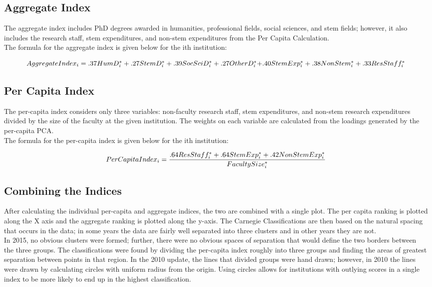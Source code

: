 \documentclass{article}
\begin{document}
\subsection{Aggregate Index}
 The aggregate index includes PhD degrees awarded in humanities, professional fields, social sciences, and stem fields; however, it also includes the research staff, stem expenditures, and non-stem expenditures from the Per Capita Calculation.\\
 The formula for the aggregate index is given below for the ith institution:
 \begin{center}
	\begin{equation}
	\centering
	$$AggregateIndex_{i} =  .37HumD^{*}_{i} + .27StemD^{*}_{i} + .39SocSciD^{*}_{i} + .27OtherD^{*}_{i} $$
	$$ + .40StemExp^{*}_{i} + .38NonStem^{*}_{i} + .33ResStaff^{*}_{i} $$
	\label{eqn:agindex}

	\end{equation}
\end{center}

  \subsection{Per Capita Index}
 The per-capita index considers only three variables: non-faculty research staff, stem expenditures, and non-stem research expenditures divided by the size of the faculty at the given institution. The weights on each variable are calculated from the loadings generated by the per-capita PCA. \\
     The formula for the per-capita index is given below for the ith institution:
     
     \begin{equation}
     \centering
     PerCapitaIndex_{i} = \frac{.64ResStaff^*_{i} + .64StemExp^*_{i} + .42NonStemExp^*_{i}}{FacultySize^*_{i}}
     \label{eqn:Per Capita Index}
     \end{equation}
     
   
  \subsection{Combining the Indices}
  After calculating the individual per-capita and aggregate indices, the two are combined with a single plot. The per capita ranking is plotted along the X axis and the aggregate ranking is plotted along the y-axis. The Carnegie Classifications are then based on the natural spacing that occurs in the data; in some years the data are fairly well separated into three clusters and in other years they are not. \\
  In 2015, no obvious clusters were formed; further, there were no obvious spaces of separation that would define the two borders between the three groups. The classifications were found by dividing the per-capita index roughly into three groups and finding the areas of greatest separation between points in that region. In the 2010 update, the lines that divided groups were hand drawn; however, in 2010 the lines were drawn by calculating circles with uniform radius from the origin. Using circles allows for institutions with outlying scores in a single index to be more likely to end up in the highest classification. 
\end{document}
